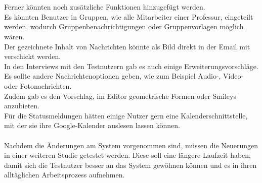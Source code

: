 % 
% 
% 
\\
\\
Ferner könnten noch zusätzliche Funktionen hinzugefügt werden.
\\
Es könnten Benutzer in Gruppen, wie \bspw alle Mitarbeiter einer Professur, eingeteilt werden, wodurch Gruppenbenachrichtigungen oder Gruppenvorlagen möglich wären.
\\
Der gezeichnete Inhalt von Nachrichten könnte als Bild direkt in der Email mit verschickt werden.
\\
In den Interviews mit den Testnutzern gab es auch einige Erweiterungsvorschläge.
Es sollte andere Nachrichtenoptionen geben, wie zum Beispiel Audio-, Video- oder Fotonachrichten.
\\
Zudem gab es den Vorschlag, im Editor geometrische Formen oder Smileys anzubieten.
\\
Für die Statusmeldungen hätten einige Nutzer gern eine Kalenderschnittstelle, mit der sie ihre Google-Kalender auslesen lassen können.
% 
% 
% 
% 
\\
\\
Nachdem die Änderungen am System vorgenommen sind, müssen die Neuerungen in einer weiteren Studie getestet werden.
Diese soll eine längere Laufzeit haben, damit sich die Testnutzer besser an das System gewöhnen können und es in ihren alltäglichen Arbeitsprozess aufnehmen.
